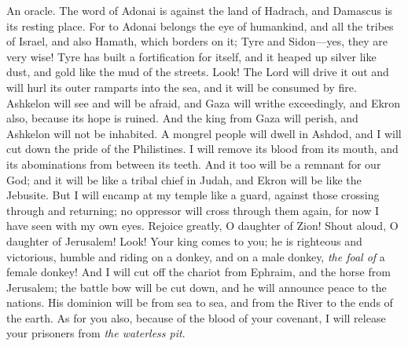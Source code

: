 \begin{biblechapter} %
\verse An oracle. The word of Adonai is against the land of Hadrach,
\verse and Damascus is its resting place. 
For to Adonai belongs the eye of humankind, 
and all the tribes of Israel,
\verse and also Hamath, which borders on it; 
Tyre and Sidon—yes, they are very wise!
\verse Tyre has built a fortification for itself, 
and it heaped up silver like dust, 
and gold like the mud of the streets.
\verse Look! The Lord will drive it out 
and will hurl its outer ramparts into the sea, 
and it will be consumed by fire.
\verse Ashkelon will see and will be afraid, 
and Gaza will writhe exceedingly, 
and Ekron also, because its hope is ruined. 
And the king from Gaza will perish, 
and Ashkelon will not be inhabited.
\verse A mongrel people will dwell in Ashdod, 
and I will cut down the pride of the Philistines.
\verse I will remove its blood from its mouth, 
and its abominations from between its teeth. 
And it too will be a remnant for our God; 
and it will be like a tribal chief in Judah, 
and Ekron will be like the Jebusite.
\verse But I will encamp at my temple like a guard, 
against those crossing through and returning; 
no oppressor will cross through them again, 
for now I have seen with my own eyes.
\verse Rejoice greatly, O daughter of Zion! 
Shout aloud, O daughter of Jerusalem! 
Look! Your king comes to you; 
he is righteous and victorious, 
humble and riding on a donkey, 
and on a male donkey, \textit{the foal of} a female donkey!
\verse And I will cut off the chariot from Ephraim, 
and the horse from Jerusalem; 
the battle bow will be cut down, 
and he will announce peace to the nations. 
His dominion will be from sea to sea, 
and from the River to the ends of the earth.
\verse As for you also, because of the blood of your covenant, 
I will release your prisoners from \textit{the waterless pit}.

\end{biblechapter}
